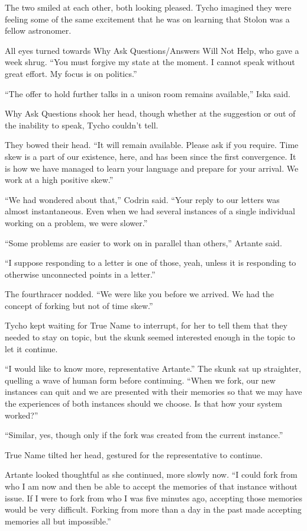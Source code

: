 The two smiled at each other, both looking pleased. Tycho imagined they were feeling some of the same excitement that he was on learning that Stolon was a fellow astronomer.

All eyes turned towards Why Ask Questions/Answers Will Not Help, who gave a week shrug. ``You must forgive my state at the moment. I cannot speak without great effort. My focus is on politics.''

``The offer to hold further talks in a unison room remains available,'' Iska said.

Why Ask Questions shook her head, though whether at the suggestion or out of the inability to speak, Tycho couldn't tell.

They bowed their head. ``It will remain available. Please ask if you require. Time skew is a part of our existence, here, and has been since the first convergence. It is how we have managed to learn your language and prepare for your arrival. We work at a high positive skew.''

``We had wondered about that,'' Codrin said. ``Your reply to our letters was almost instantaneous. Even when we had several instances of a single individual working on a problem, we were slower.''

``Some problems are easier to work on in parallel than others,'' Artante said.

``I suppose responding to a letter is one of those, yeah, unless it is responding to otherwise unconnected points in a letter.''

The fourthracer nodded. ``We were like you before we arrived. We had the concept of forking but not of time skew.''

Tycho kept waiting for True Name to interrupt, for her to tell them that they needed to stay on topic, but the skunk seemed interested enough in the topic to let it continue.

``I would like to know more, representative Artante.'' The skunk sat up straighter, quelling a wave of human form before continuing. ``When we fork, our new instances can quit and we are presented with their memories so that we may have the experiences of both instances should we choose. Is that how your system worked?''

``Similar, yes, though only if the fork was created from the current instance.''

True Name tilted her head, gestured for the representative to continue.

Artante looked thoughtful as she continued, more slowly now. ``I could fork from who I am now and then be able to accept the memories of that instance without issue. If I were to fork from who I was five minutes ago, accepting those memories would be very difficult. Forking from more than a day in the past made accepting memories all but impossible.''

